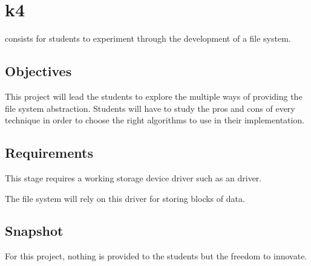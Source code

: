 %
%
%
%
%
%

%
%

\chapter{k4}
\label{chapter:k4}

 consists for students to experiment through the development of
a file system.

\newpage

%
%

%
%

\section{Objectives}

This project will lead the students to explore the multiple ways of providing
the file system abstraction. Students will have to study the pros and cons of
every technique in order to choose the right algorithms to use in their
implementation.

%
%

\section{Requirements}

This stage requires a working storage device driver such as an  driver.

The file system will rely on this driver for storing blocks of data.

%
%

\section{Snapshot}

For this project, nothing is provided to the students but the freedom to
innovate.

%
%

